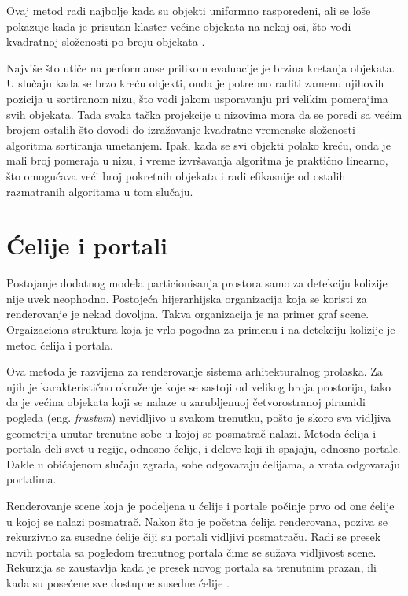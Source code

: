 \documentclass[12pt,oneside]{memoir}
\begin{document}
Ovaj metod radi najbolje kada su objekti uniformno raspoređeni, ali se loše pokazuje kada je
prisutan klaster većine objekata na nekoj osi, što vodi kvadratnoj složenosti po broju objekata \cite{glavna2}.

Najviše što utiče na performanse prilikom evaluacije je brzina kretanja objekata. 
U slučaju kada se brzo kreću objekti, onda je potrebno raditi zamenu njihovih pozicija u sortiranom nizu,
što vodi jakom usporavanju pri velikim pomerajima svih objekata. Tada svaka tačka projekcije u nizovima mora 
da se poredi sa većim brojem ostalih što dovodi do izražavanje kvadratne vremenske složenosti algoritma sortiranja umetanjem.
Ipak, kada se svi objekti polako kreću, onda je mali broj pomeraja u nizu, i vreme izvršavanja algoritma je praktično 
linearno, što omogućava veći broj pokretnih objekata i radi efikasnije od ostalih razmatranih algoritama u tom slučaju.

\section{Ćelije i portali}
\label{subsec:cells}

Postojanje dodatnog modela particionisanja prostora samo za detekciju kolizije nije uvek neophodno.
Postojeća hijerarhijska organizacija koja se koristi za renderovanje je nekad dovoljna.
Takva organizacija je na primer graf scene. Orgaizaciona struktura koja je vrlo pogodna
za primenu i na detekciju kolizije je metod ćelija i portala.

Ova metoda je razvijena za renderovanje sistema arhitekturalnog prolaska. 
Za njih je karakteristično okruženje koje se sastoji od velikog broja prostorija, tako da je 
većina objekata koji se nalaze u zarubljenuoj četvorostranoj piramidi pogleda (eng. {\em frustum})
nevidljivo u svakom trenutku, pošto je skoro sva vidljiva geometrija unutar trenutne sobe
u kojoj se posmatrač nalazi.
Metoda ćelija i portala deli svet u regije, odnosno ćelije, i delove koji ih spajaju, odnosno portale.
Dakle u običajenom slučaju zgrada, sobe odgovaraju ćelijama, a vrata odgovaraju portalima. 

Renderovanje scene koja je podeljena u ćelije i portale počinje prvo od one ćelije u 
kojoj se nalazi posmatrač. Nakon što je početna ćelija renderovana, poziva se rekurzivno
za susedne ćelije čiji su portali vidljivi posmatraču. Radi se presek novih portala
sa pogledom trenutnog portala čime se sužava vidljivost scene. Rekurzija se zaustavlja 
kada je presek novog portala sa trenutnim prazan, ili kada su posećene sve dostupne susedne ćelije \cite{glavnaKnjiga}.
\end{document}
